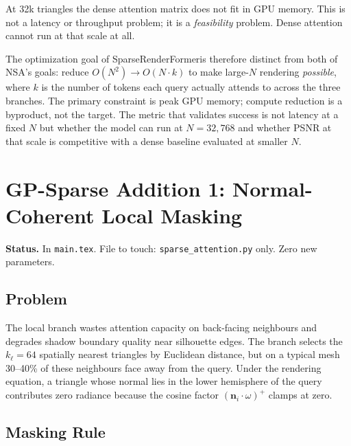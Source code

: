 \documentclass[11pt,letterpaper]{article}
\newcommand{\ours}{SparseRenderFormer}
\newcommand{\code}[1]{\texttt{#1}}
\begin{document}
At 32k triangles the dense attention matrix does not fit in GPU memory.
This is not a latency or throughput problem; it is a \emph{feasibility}
problem.
Dense attention cannot run at that scale at all.

The optimization goal of \ours is therefore distinct from both of NSA's
goals: reduce $O(N^2) \to O(N \cdot k)$ to make large-$N$ rendering
\emph{possible}, where $k$ is the number of tokens each query actually
attends to across the three branches.
The primary constraint is peak GPU memory; compute reduction is a
byproduct, not the target.
The metric that validates success is not latency at a fixed $N$ but
whether the model can run at $N = 32{,}768$ and whether PSNR at that
scale is competitive with a dense baseline evaluated at smaller $N$.

\section{GP-Sparse Addition 1: Normal-Coherent Local Masking}
\label{sec:main}

\begin{mdframed}[linecolor=black!30, backgroundcolor=gray!5]
\textbf{Status.} In \texttt{main.tex}.
File to touch: \code{sparse\_attention.py} only.
Zero new parameters.
\end{mdframed}

\subsection{Problem}

The local branch wastes attention capacity on back-facing neighbours
and degrades shadow boundary quality near silhouette edges.
The branch selects the $k_\ell = 64$ spatially nearest triangles by
Euclidean distance, but on a typical mesh 30--40\% of these neighbours
face away from the query.
Under the rendering equation, a triangle whose normal lies in the lower
hemisphere of the query contributes zero radiance because the cosine
factor $(\mathbf{n}_i \cdot \omega)^+$ clamps at zero.

\subsection{Masking Rule}
\end{document}

